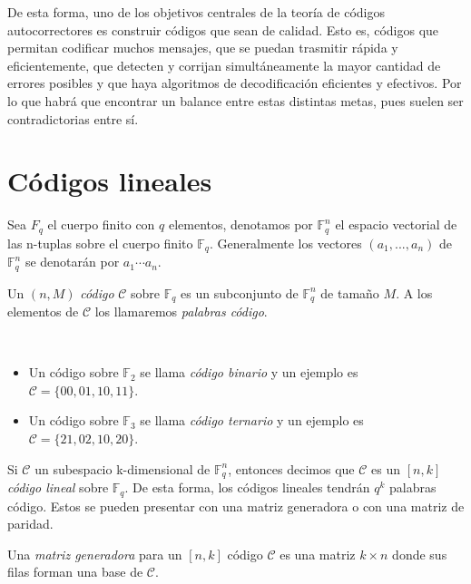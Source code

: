 De esta forma, uno de los objetivos centrales de la teoría de códigos autocorrectores es construir códigos que sean de calidad. Esto es, códigos que permitan codificar muchos mensajes, que se puedan trasmitir rápida y eficientemente, que detecten y corrijan simultáneamente la mayor cantidad de errores posibles y que haya algoritmos de decodificación eficientes y efectivos. Por lo que habrá que encontrar un balance entre estas distintas metas, pues suelen ser contradictorias entre sí.

\section{Códigos lineales}

Sea $F_q$ el cuerpo finito con $q$ elementos, denotamos por $\mathbb{F}_q^n$ el espacio vectorial de las n-tuplas sobre el cuerpo finito $\mathbb{F}_q$. Generalmente los vectores $(a_1, ..., a_n)$ de $\mathbb{F}_q^n$ se denotarán por $a_1 \cdots a_n$.

\begin{definition}
    Un $(n, M)$ \emph{código} $\mathcal{C}$ sobre $\mathbb{F}_q$ es un subconjunto de 
    $\mathbb{F}_q^n$ de tamaño $M$. A los elementos de $\mathcal{C}$ los llamaremos \emph{palabras código}.
\end{definition}

\begin{exampleth}
    $ $
    \begin{itemize}
        \item Un código sobre $\mathbb{F}_2$ se llama \emph{código binario} y un ejemplo es $\mathcal{C} = \{00, 01, 10, 11\}$.
        \item Un código sobre $\mathbb{F}_3$ se llama \emph{código ternario} y un ejemplo es $\mathcal{C} = \{21, 02, 10, 20\}$.
    \end{itemize}
\end{exampleth}

Si $\mathcal{C}$ un subespacio k-dimensional de $\mathbb{F}_q^n$, entonces decimos que $\mathcal{C}$ es un $\left[ n, k \right]$ \emph{código lineal} sobre $\mathbb{F}_q$. De esta forma, los códigos lineales tendrán $q^k$ palabras código. Estos se pueden presentar con una matriz generadora o con una matriz de paridad.

\begin{definition}
    Una \emph{matriz generadora} para un $\left[ n,k \right]$ código $\mathcal{C}$ es una matriz $k \times n$ donde sus filas forman una base de $\mathcal{C}$.
\end{definition}

